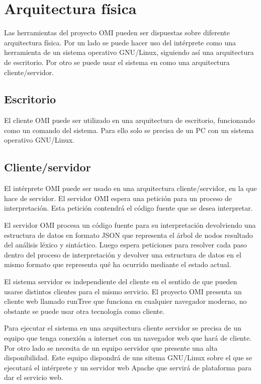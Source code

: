 \section {Arquitectura física}
Las herramientas del proyecto OMI pueden ser dispuestas sobre diferente arquitectura física. Por un lado se puede hacer uso 
del intérprete como una herramienta de un sistema operativo GNU/Linux, siguiendo así una arquitectura de escritorio. 
Por otro se puede usar el sistema en como una arquitectura cliente/servidor.

\subsection{Escritorio}
El cliente OMI puede ser utilizado en una arquitectura de escritorio, funcionando como un comando del sistema. Para ello solo se precisa de un PC con un sistema operativo GNU/Linux.

\subsection{Cliente/servidor}
El intérprete OMI puede ser usado en una arquitectura cliente/servidor, en la que hace de servidor. El servidor OMI espera una petición para un proceso de interpretación. Esta petición
contendrá el código fuente que se desea interpretar.

El servidor OMI procesa un código fuente para su interpretación devolviendo una estructura de datos en formato JSON que representa el árbol de nodos resultado del análisis léxico y sintáctico. 
Luego espera peticiones para resolver cada paso dentro del proceso de interpretación y devolver una estructura de datos en el mismo formato que representa qué ha ocurrido mediante el estado actual.

El sistema servidor es independiente del cliente en el sentido de que pueden usarse distintos clientes para el mismo servicio. El proyecto OMI presenta un cliente web llamado runTree 
que funciona en cualquier navegador moderno, no obstante se puede usar otra tecnología como cliente. 

Para ejecutar el sistema en una arquitectura cliente servidor se precisa de un equipo que tenga conexión a internet con un navegador web que hará de cliente. Por otro lado se necesita de un equipo servidor
que presente una alta disponibilidad. Este equipo dispondrá de uns sitema GNU/Linux sobre el que se ejecutará el intérprete y un servidor web Apache que servirá de plataforma para dar el servicio web.

